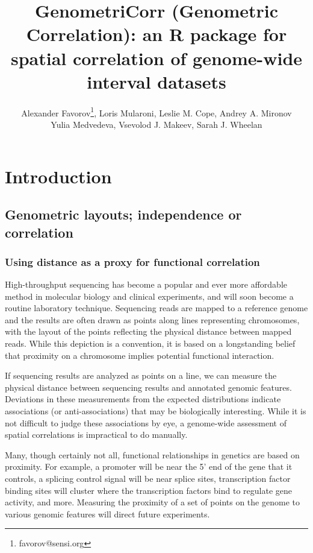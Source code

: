 \documentclass{article}
\begin{document}
\title{GenometriCorr (Genometric Correlation): an R package for spatial correlation of genome-wide interval datasets}
\author{Alexander Favorov\footnote{favorov@sensi.org}, Loris Mularoni, Leslie M. Cope, Andrey A. Mironov\\ Yulia Medvedeva, Vsevolod J. Makeev, Sarah J. Wheelan}

\maketitle

\section{Introduction}

\newcommand{\picscale}{0.5}

\subsection{Genometric layouts; independence or correlation}
\subsubsection{Using distance as a proxy for functional correlation}
High-throughput sequencing has become a popular and ever more affordable method in molecular biology and clinical experiments, and will soon become a routine laboratory technique. Sequencing reads are mapped to a reference genome and the results are often drawn as points along lines representing chromosomes, with the layout of the points reflecting the physical distance between mapped reads. While this depiction is a convention, it is based on a longstanding belief that proximity on a chromosome implies potential functional interaction.

If sequencing results are analyzed as points on a line, we can measure the physical distance between sequencing results and annotated genomic features. Deviations in these measurements from the expected distributions indicate associations (or anti-associations) that may be biologically interesting. While it is not difficult to judge these associations by eye, a genome-wide assessment of spatial correlations is impractical to do manually.

Many, though certainly not all, functional relationships in genetics are based on proximity. For example, a promoter will be near the 5' end of the gene that it controls, a splicing control signal will be near splice sites, transcription factor binding sites will cluster where the transcription factors bind to regulate gene activity, and more. Measuring the proximity of a set of points on the genome to various genomic features will direct future experiments.
\end{document}
